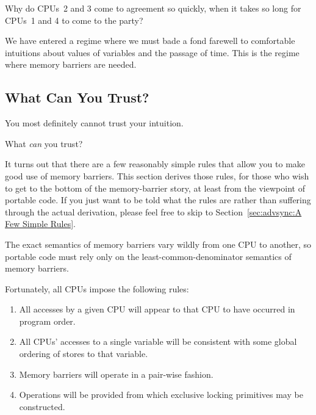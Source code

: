 \QuickQuiz{}
	Why do CPUs~2 and 3 come to agreement so quickly, when it
	takes so long for CPUs~1 and 4 to come to the party?
 \QuickQuizEnd

We have entered a regime where we must bade a fond farewell to
comfortable intuitions about values of variables and the passage of time.
This is the regime where memory barriers are needed.


\subsection{What Can You Trust?}
\label{sec:advsync:What Can You Trust?}

You most definitely cannot trust your intuition.

What \emph{can} you trust?

It turns out that there are a few reasonably simple rules that
allow you to make good use of memory barriers.
This section derives those rules, for those who wish to get
to the bottom of the memory-barrier story, at least from the viewpoint
of portable code.
If you just want to be told what the rules are rather than suffering
through the actual derivation,
please feel free to skip to Section~\ref{sec:advsync:A Few Simple Rules}.

The exact semantics of memory barriers vary wildly from one CPU to
another, so portable code must rely only on the least-common-denominator
semantics of memory barriers.

Fortunately, all CPUs impose the following rules:
\begin{enumerate}
\item	All accesses by a given CPU will appear to that CPU to have
	occurred in program order.
\item	All CPUs' accesses to a single variable will be consistent with
	some global ordering of stores to that variable.
\item	Memory barriers will operate in a pair-wise fashion.
\item	Operations will be provided from which exclusive locking
	primitives may be constructed.
\end{enumerate}

